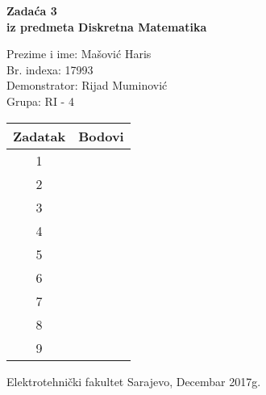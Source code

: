 \documentclass[12pt]{article}
\newcommand{\prezimeIme}{Mašović Haris}
\newcommand{\brIndexa}{17993}
\newcommand{\brZadace}{3}
\begin{document}
    
    \thispagestyle{empty}
    \begin{center}
      \vspace*{1cm}

      \vspace*{2cm}
      {\huge \bf Zadaća \brZadace } \\
      \vspace*{1cm}
      {\Large \bf iz predmeta Diskretna Matematika}

      \vspace*{1.25cm}

      {\Large Prezime i ime: \prezimeIme} \\
      \vspace*{0.5cm}
      {\Large Br. indexa: \brIndexa} \\
      \vspace*{0.5cm}
      {\Large Demonstrator: Rijad Muminović} \\
      \vspace*{0.5cm}
      {\Large Grupa: RI - 4} \\ 
      
      \vspace*{2cm}
      \renewcommand{\arraystretch}{1.75}
      \begin{tabular}{|c|c|}
    	\hline Zadatak & Bodovi \\
    	\hline 1 &  \\
    	\hline 2 &  \\
    	\hline 3 &  \\
    	\hline 4 &  \\
    	\hline 5 &  \\
    	\hline 6 &  \\
    	\hline 7 &  \\
    	\hline 8 &  \\
    	\hline 9 &  \\
    	\hline
     \end{tabular}

      \vfill


      {\large Elektrotehnički fakultet Sarajevo, Decembar 2017g.}

    \end{center}
    \newpage
    \thispagestyle{empty}
    
\end{document}
